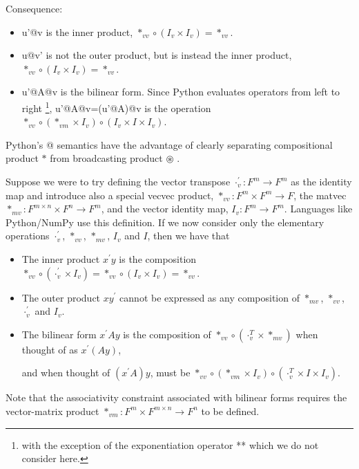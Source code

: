 Consequence:
\begin{itemize}
\item u'@v is the inner product, $*_{vv}\circ\left(I_{v}\times I_{v}\right)=*_{vv}$.
\item u@v' is not the outer product, but is instead the inner product, $*_{vv}\circ\left(I_{v}\times I_{v}\right)=*_{vv}$.
\item u'@A@v is the bilinear form. Since Python evaluates operators from
left to right \footnote{with the exception of the exponentiation operator {*}{*} which we
do not consider here.}, u'@A@v=(u'@A)@v is the operation $*_{vv}\circ\left(*_{vm}\times I_{v}\right)\circ\left(I_{v}\times I\times I_{v}\right)$.
\end{itemize}
Python's @ semantics have the advantage of clearly separating compositional
product $*$ from broadcasting product $\circledast$ .


Suppose we were to try defining the vector transpose $\cdot_{v}^\prime:F^{m}\rightarrow F^{m}$
as the identity map and introduce also a special vecvec product, $*_{vv}:F^{m}\times F^{m}\rightarrow F$,
the matvec $*_{mv}:F^{m\times n}\times F^{n}\rightarrow F^{m}$, and
the vector identity map, $I_{v}:F^{m}\rightarrow F^{m}$. Languages
like Python/NumPy use this definition. If we now consider only the
elementary operations $\cdot_{v}^\prime$, $*_{vv}$, $*_{mv}$, $I_{v}$
and $I$, then we have that
\begin{itemize}
\item
The inner product $x^\prime y$ is the composition $*_{vv}\circ\left(\cdot_{v}^\prime\times I_{v}\right)=*_{vv}\circ\left(I_{v}\times I_{v}\right)=*_{vv}$.

\item
The outer product $xy^\prime$ cannot be expressed as any composition of
$*_{mv}$, $*_{vv}$, $\cdot_{v}^\prime$ and $I_{v}$.

\item
The bilinear form $x^\prime Ay$ is the composition of
$*_{vv}\circ\left(\cdot_{v}^{T}\times*_{mv}\right)$
when thought of as $x^\prime \left(Ay\right)$,

and when thought of $\left(x^\prime A\right)y$, must be
$*_{vv}\circ\left(*_{vm}\times I_{v}\right)\circ\left(\cdot_{v}^{T}\times I\times I_{v}\right)$.

\end{itemize}

Note that the associativity constraint associated with bilinear forms
requires the vector-matrix product $*_{vm}:F^{m}\times F^{m\times n}\rightarrow F^{n}$ to be defined.


